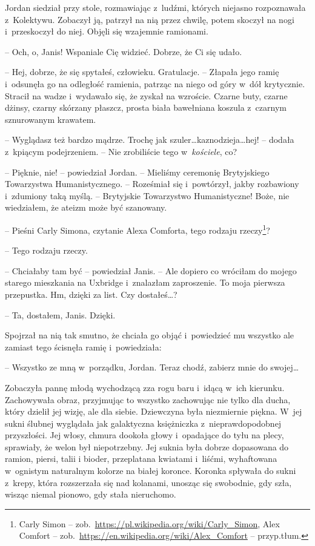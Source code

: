 \documentclass[oneside,polish,11pt,sfheadings]{mwbk}
\begin{document}
Jordan siedział przy stole, rozmawiając z~ludźmi, których niejasno
rozpoznawała z~Kolektywu. Zobaczył ją, patrzył na nią przez chwilę,
potem skoczył na nogi i~przeskoczył do niej. Objęli się wzajemnie
ramionami.

-- Och, o, Janis! Wspaniale Cię widzieć. Dobrze, że Ci się udało.

-- Hej, dobrze, że się spytałeś, człowieku. Gratulacje. -- Złapała jego
ramię i~odsunęła go na odległość ramienia, patrząc na niego od góry w~dół krytycznie. Stracił na wadze i~wydawało się, że zyskał na wzroście.
Czarne buty, czarne dżinsy, czarny skórzany płaszcz, prosta biała
bawełniana koszula z~czarnym sznurowanym krawatem. 

-- Wyglądasz też
bardzo mądrze. Trochę jak szuler\ldots kaznodzieja\ldots hej! -- dodała z~kpiącym podejrzeniem. -- Nie zrobiliście tego w~\emph{kościele}, co?

-- Pięknie, nie! -- powiedział Jordan. -- Mieliśmy ceremonię Brytyjskiego
Towarzystwa Humanistycznego. -- Roześmiał się i~powtórzył, jakby
rozbawiony i~zdumiony taką myślą. -- Brytyjskie Towarzystwo
Humanistyczne! Boże, nie wiedziałem, że ateizm może być szanowany.

-- Pieśni Carly Simona, czytanie Alexa Comforta, tego rodzaju rzeczy\footnote{ 
Carly Simon --
zob.~\url{https://pl.wikipedia.org/wiki/Carly\_Simon}, Alex
Comfort --
zob.~\url{https://en.wikipedia.org/wiki/Alex\_Comfort} -- przyp.tłum.}?


-- Tego rodzaju rzeczy.

-- Chciałaby tam być -- powiedział Janis. -- Ale dopiero co wróciłam do
mojego starego mieszkania na Uxbridge i~znalazłam zaproszenie. To moja
pierwsza przepustka. Hm, dzięki za list. Czy dostałeś\ldots?

-- Ta, dostałem, Janis. Dzięki.

Spojrzał na nią tak smutno, że chciała go objąć i~powiedzieć mu
wszyst\-ko ale zamiast tego ścisnęła ramię i~powiedziała: 

-- Wszystko ze
mną w~porządku, Jordan. Teraz chodź, zabierz mnie do swojej\ldots

Zobaczyła pannę młodą wychodzącą zza rogu baru i~idącą w~ich kierunku.
Zachowywała obraz, przyjmując to wszyst\-ko zachowując nie tylko dla
ducha, który dzielił jej wizję, ale dla siebie. Dziewczyna była
niezmiernie piękna. W~jej sukni ślubnej wyglądała jak galaktyczna
księżniczka z~nieprawdopodobnej przyszłości. Jej włosy, chmura dookoła
głowy i~opadające do tyłu na plecy, sprawiały, że welon był
niepotrzebny. Jej suknia była dobrze dopasowana do ramion, piersi, talii
i bioder, przeplatana kwiatami i~liśćmi, wyhaftowana w~ognistym
naturalnym kolorze na białej koronce. Koronka spływała do sukni z~krepy,
która rozszerzała się nad kolanami, unosząc się swobodnie, gdy szła,
wisząc niemal pionowo, gdy stała nieruchomo.
\end{document}
